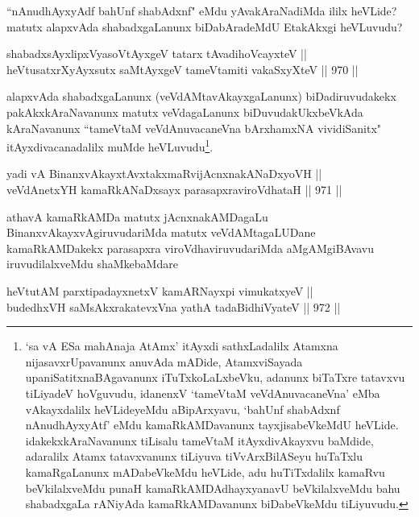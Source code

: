 \begin{artha}
``nAnudhAyxyAdf bahUnf shabAdxnf" eMdu yAvakAraNadiMda ililx heVLide? matutx alapxvAda shabadxgaLanunx biDabAradeMdU EtakAkxgi heVLuvudu?
\end{artha}


\begin{shl}
shabadxsAyxlipxVyasoV\s tAyxgeV tatarx tAvadihoVcayxteV || \\
heVtusatxrXyAyxsutx saMtAyxgeV tameVtamiti vakaSxyXteV \hfill || 970 ||  
\end{shl}

\begin{artha}
alapxvAda shabadxgaLanunx (veVdAMtavAkayxgaLanunx) biDadiruvudakekx pakAkxkAraNavanunx matutx veVdagaLanunx biDuvudakUkxbeVkAda kAraNavanunx ``tameVtaM veVdAnuvacaneVna bArxhamxNA vividiSanitx" itAyxdivacanadalilx muMde heVLuvudu\footnote{`sa vA ESa mahAnaja AtAmx' itAyxdi sathxLadalilx Atamxna nijasavxrUpavanunx anuvAda mADide, AtamxviSayada upaniSatitxnaBAgavanunx iTuTxkoLaLxbeVku, adanunx biTaTxre tatavxvu tiLiyadeV hoVguvudu, idanenxV `tameVtaM veVdAnuvacaneVna' eMba vAkayxdalilx heVLideyeMdu aBipArxyavu, `bahUnf shabAdxnf nAnudhAyxyAtf' eMdu kamaRkAMDavanunx tayxjisabeVkeMdU heVLide. idakekxkAraNavanunx tiLisalu tameVtaM itAyxdivAkayxvu baMdide, adaralilx Atamx tatavxvanunx tiLiyuva tiVvArxBilASeyu huTaTxlu kamaRgaLanunx mADabeVkeMdu heVLide, adu huTiTxdalilx kamaRvu beVkilalxveMdu punaH kamaRkAMDAdhayxyanavU beVkilalxveMdu bahu shabadxgaLa rANiyAda kamaRkAMDavanunx biDabeVkeMdu tiLiyuvudu.}.
\end{artha}


\begin{shl}
yadi vA BinanxvAkayxtAvxtakxmaRvijAcnxnakANaDxyoVH || \\
veVdAnetxYH kamaRkANaDxsayx parasapxraviroVdhataH \hfill || 971 ||  
\end{shl}

\begin{artha}
athavA kamaRkAMDa matutx jAcnxnakAMDagaLu BinanxvAkayxvAgiru\-vudariMda matutx veVdAMtagaLUDane kamaRkAMDakekx parasapxra viroVdhaviruvudariMda aMgAMgiBAvavu iruvudilalxveMdu shaMkebaMdare\ndash 
\end{artha}


\begin{shl}
heVtutAM parxtipadayxnetxV kamARNayxpi vimukatxyeV || \\
budedhxVH saMsAkxrakatevxVna yathA tadaBidhiVyateV \hfill || 972 ||  
\end{shl}

